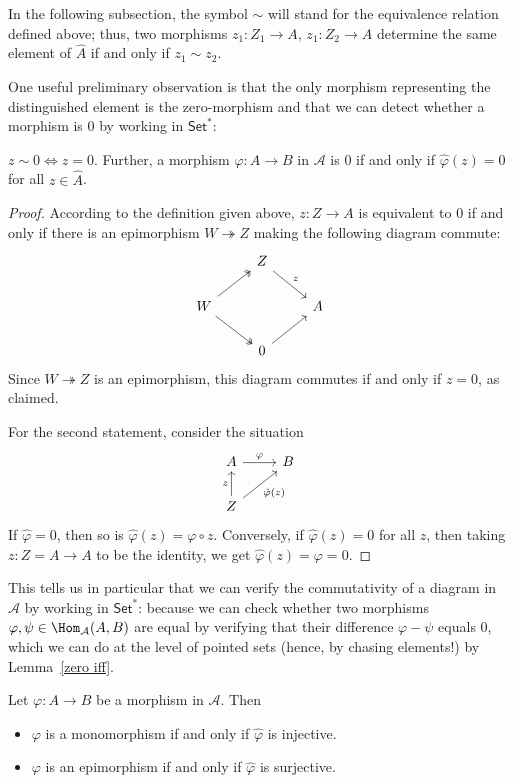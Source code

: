 In the following subsection, the symbol $\sim$ will stand for the equivalence relation defined above; thus, two morphisms $z_1:Z_1\to A$, $z_1:Z_2\to A$ determine the same element of $\hat{A}$ if and only if $z_1\sim z_2$.\par
One useful preliminary observation is that the only morphism representing the
distinguished element is the zero-morphism and that we can detect whether a morphism is $0$ by working in $\mathsf{Set}^*$:
\begin{lemma}\label{zero iff}
$z\sim 0\iff z=0$. Further, a morphism $\varphi:A\to B$ in $\mathcal{A}$ is $0$ if and
only if $\hat{\varphi}(z)=0$ for all $z\in\hat{A}$.
\end{lemma}
\begin{proof}
According to the definition given above, $z:Z\to A$ is equivalent to $0$ if and only if there is an epimorphism $W\twoheadrightarrow Z$ making the following diagram commute:
\[\begin{tikzcd}
&Z\ar[rd,"z"]&\\
W\ar[ru,twoheadrightarrow]\ar[rd,twoheadrightarrow]&&A\\
&0\ar[ru]
\end{tikzcd}\]
Since $W\twoheadrightarrow Z$ is an epimorphism, this diagram commutes if and only if $z=0$, as claimed.\par
For the second statement, consider the situation
\[\begin{tikzcd}
A\ar[r,"\varphi"]&B\\
Z\ar[u,"z"]\ar[ru,swap,"\hat{\varphi}(z)"]
\end{tikzcd}\]
If $\hat{\varphi}=0$, then so is $\hat{\varphi}(z)=\varphi\circ z$. Conversely, if $\hat{\varphi}(z)=0$ for all $z$, then taking $z:Z=A\to A$ to be the identity, we get $\hat{\varphi}(z)=\varphi=0$.
\end{proof}
This tells us in particular that we can verify the commutativity of a diagram in $\mathcal{A}$ by working in $\mathsf{Set}^*$: because we can check whether two morphisms $\varphi,\psi\in\Hom_{\mathcal{A}}(A,B)$ are equal by verifying that their difference $\varphi-\psi$ equals $0$, which we can do at the level of pointed sets (hence, by chasing elements!) by Lemma~\ref{zero iff}.
\begin{lemma}\label{mono inje}
Let $\varphi:A\to B$ be a morphism in $\mathcal{A}$. Then
\begin{itemize}
\item $\varphi$ is a monomorphism if and only if $\hat{\varphi}$ is injective.
\item $\varphi$ is an epimorphism if and only if $\hat{\varphi}$ is surjective.
\end{itemize}
\end{lemma}
